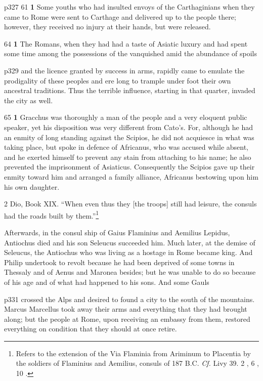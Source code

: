 p327
61
\textbf{1} Some youths who had insulted envoys of the Carthaginians when they came to Rome were sent to Carthage and delivered up to the people there; however, they received no injury at their hands, but were released.

64
\textbf{1} The Romans, when they had had a taste of Asiatic luxury and had spent some time among the possessions of the vanquished amid the abundance of spoils

p329 and the licence granted by success in arms, rapidly came to emulate the prodigality of these peoples and ere long to trample under foot their own ancestral traditions. Thus the terrible influence, starting in that quarter, invaded the city as well.

65
\textbf{1} Gracchus was thoroughly a man of the people and a very eloquent public speaker, yet his disposition was very different from Cato's. For, although he had an enmity of long standing against the Scipios, he did not acquiesce in what was taking place, but spoke in defence of Africanus, who was accused while absent, and he exerted himself to prevent any stain from attaching to his name; he also prevented the imprisonment of Asiaticus. Consequently the Scipios gave up their enmity toward him and arranged a family alliance, Africanus bestowing upon him his own daughter.

2
Dio, Book XIX. ``When even thus they [the troops] still had leisure, the consuls had the roads built by them.''\footnote{Refers to the extension of the Via Flaminia from Ariminum to Placentia by the soldiers of Flaminius and Aemilius, consuls of 187 B.C. \emph{Cf.} Livy 39. 2 , 6 , 10 .

}

Afterwards, in the consul ­ship of Gaius Flaminius and Aemilius Lepidus, Antiochus died and his son Seleucus succeeded him. Much later, at the demise of Seleucus, the Antiochus who was living as a hostage in Rome became king. And Philip undertook to revolt because he had been deprived of some towns in Thessaly and of Aenus and Maronea besides; but he was unable to do so because of his age and of what had happened to his sons. And some Gauls

p331 crossed the Alps and desired to found a city to the south of the mountains. Marcus Marcellus took away their arms and everything that they had brought along; but the people at Rome, upon receiving an embassy from them, restored everything on condition that they should at once retire.


